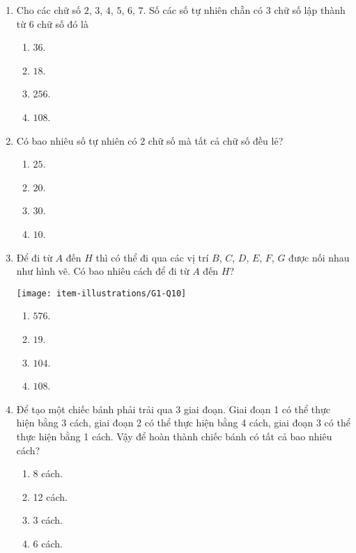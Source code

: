 \begin{enumerate}[label=\textbf{Câu \arabic*.},align=left,left=0cm..0cm,itemindent=*]
	\item Cho các chữ số $2$, $3$, $4$, $5$, $6$, $7$. Số các số tự nhiên chẵn có 3 chữ số lập thành từ 6 chữ số đó là
	\begin{multicols}{4}\begin{enumerate}[label=\textbf{\Alph*.},align=left,left=1cm..0cm,itemindent=*]
		\item $36$. \item $18$. \item $256$. \item $108$.
	\end{enumerate}\end{multicols}
	\item Có bao nhiêu số tự nhiên có 2 chữ số mà tất cả chữ số đều lẻ?
	\begin{multicols}{4}\begin{enumerate}[label=\textbf{\Alph*.},align=left,left=1cm..0cm,itemindent=*]
		\item $25$. \item $20$. \item $30$. \item $10$.
	\end{enumerate}\end{multicols}
	\item Để đi từ $A$ đến $H$ thì có thể đi qua các vị trí $B$, $C$, $D$, $E$, $F$, $G$ được nối nhau như hình vẽ. Có bao nhiêu cách để đi từ $A$ đến $H$?\par
	{\centering\texttt{[image: item-illustrations/G1-Q10]}\par}
	\begin{multicols}{4}\begin{enumerate}[label=\textbf{\Alph*.},align=left,left=1cm..0cm,itemindent=*]
		\item $576$. \item $19$. \item $104$. \item $108$.
	\end{enumerate}\end{multicols}
	\item Để tạo một chiếc bánh phải trải qua 3 giai đoạn. Giai đoạn 1 có thể thực hiện bằng 3 cách, giai đoạn 2 có thể thực hiện bằng 4 cách, giai đoạn 3 có thể thực hiện bằng 1 cách. Vậy để hoàn thành chiếc bánh có tất cả bao nhiêu cách?
	\begin{multicols}{4}\begin{enumerate}[label=\textbf{\Alph*.},align=left,left=1cm..0cm,itemindent=*]
		\item 8 cách. \item 12 cách. \item 3 cách. \item 6 cách.

\end{enumerate}
\end{multicols}
\end{enumerate}
